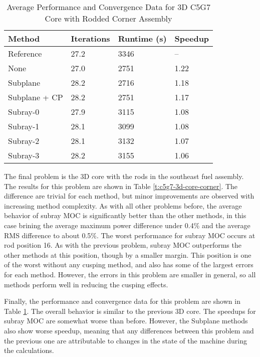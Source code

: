 \begin{table}[h]
\centering
\caption[3D C5G7 Core with Rodded Corner Assembly Performance]{Average Performance and Convergence Data for 3D C5G7 Core with Rodded Corner Assembly}\label{t:subray-performance-3Dcore-corner}
\begin{tabular}{l l l l}\toprule
    Method & Iterations & Runtime (s) & Speedup \\\midrule
    Reference     & 27.2 & 3346 & --   \\
    None          & 27.0 & 2751 & 1.22 \\
    Subplane      & 28.2 & 2716 & 1.18 \\
    Subplane + CP & 28.2 & 2751 & 1.17 \\
    Subray-0      & 27.9 & 3115 & 1.08 \\
    Subray-1      & 28.1 & 3099 & 1.08 \\
    Subray-2      & 28.1 & 3132 & 1.07 \\
    Subray-3      & 28.2 & 3155 & 1.06 \\
    \bottomrule
\end{tabular}
\end{table}

The final problem is the 3D core with the rods in the southeast fuel assembly.  The results for this problem are shown in Table \ref{t:c5g7-3d-core-corner}.  The \keff{} difference are trivial for each method, but minor improvements are observed with increasing method complexity.  As with all other problems before, the average behavior of subray MOC is significantly better than the other methods, in this case brining the average maximum power difference under 0.4\% and the average RMS difference to about 0.5\%.  The worst performance for subray MOC occurs at rod position 16.  As with the previous problem, subray MOC outperforms the other methods at this position, though by a smaller margin.  This position is one of the worst without any cusping method, and also has some of the largest errors for each method.  However, the errors in this problem are smaller in general, so all methods perform well in reducing the cusping effects.

Finally, the performance and convergence data for this problem are shown in Table \ref{t:subray-performance-3Dcore-corner}.  The overall behavior is similar to the previous 3D core.  The speedups for subray MOC are somewhat worse than before.  However, the Subplane methods also show worse speedup, meaning that any differences between this problem and the previous one are attributable to changes in the state of the machine during the calculations.